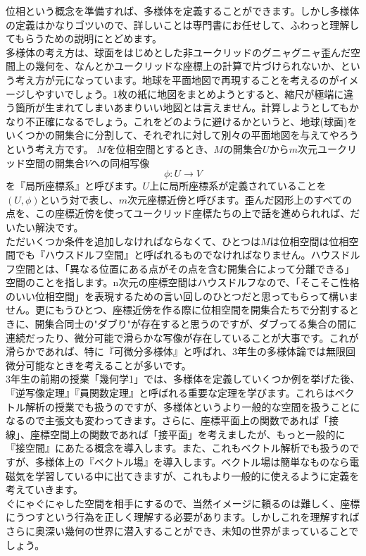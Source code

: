 位相という概念を準備すれば、多様体を定義することができます。しかし多様体の定義はかなりゴツいので、詳しいことは専門書にお任せして、ふわっと理解してもらうための説明にとどめます。\\
多様体の考え方は、球面をはじめとした非ユークリッドのグニャグニャ歪んだ空間上の幾何を、なんとかユークリッドな座標上の計算で片づけられないか、という考え方が元になっています。地球を平面地図で再現することを考えるのがイメージしやすいでしょう。1枚の紙に地図をまとめようとすると、縮尺が極端に違う箇所が生まれてしまいあまりいい地図とは言えません。計算しようとしてもかなり不正確になるでしょう。これをどのように避けるかというと、地球(球面)をいくつかの開集合に分割して、それぞれに対して別々の平面地図を与えてやろうという考え方です。
$M$を位相空間とするとき、$M$の開集合$U$から$m$次元ユークリッド空間の開集合$V$への同相写像
\[
\phi : U \rightarrow V
\]
を『局所座標系』と呼びます。$U$上に局所座標系が定義されていることを$(U,\phi)$という対で表し、$m$次元座標近傍と呼びます。歪んだ図形上のすべての点を、この座標近傍を使ってユークリッド座標たちの上で話を進められれば、だいたい解決です。\\
ただいくつか条件を追加しなければならなくて、ひとつは$M$は位相空間は位相空間でも『ハウスドルフ空間』と呼ばれるものでなければなりません。ハウスドルフ空間とは、「異なる位置にある点がその点を含む開集合によって分離できる」空間のことを指します。n次元の座標空間はハウスドルフなので、「そこそこ性格のいい位相空間」を表現するための言い回しのひとつだと思ってもらって構いません。更にもうひとつ、座標近傍を作る際に位相空間を開集合たちで分割するときに、開集合同士の"ダブり"が存在すると思うのですが、ダブってる集合の間に連続だったり、微分可能で滑らかな写像が存在していることが大事です。これが滑らかであれば、特に『可微分多様体』と呼ばれ、3年生の多様体論では無限回微分可能なときを考えることが多いです。\\
3年生の前期の授業「幾何学1」では、多様体を定義していくつか例を挙げた後、『逆写像定理』『員関数定理』と呼ばれる重要な定理を学びます。これらはベクトル解析の授業でも扱うのですが、多様体というより一般的な空間を扱うことになるので主張文も変わってきます。さらに、座標平面上の関数であれば「接線」、座標空間上の関数であれば「接平面」を考えましたが、もっと一般的に『接空間』にあたる概念を導入します。また、これもベクトル解析でも扱うのですが、多様体上の『ベクトル場』を導入します。ベクトル場は簡単なものなら電磁気を学習している中に出てきますが、これもより一般的に使えるように定義を考えていきます。\\
ぐにゃぐにゃした空間を相手にするので、当然イメージに頼るのは難しく、座標にうつすという行為を正しく理解する必要があります。しかしこれを理解すればさらに奥深い幾何の世界に潜入することができ、未知の世界がまっていることでしょう。

